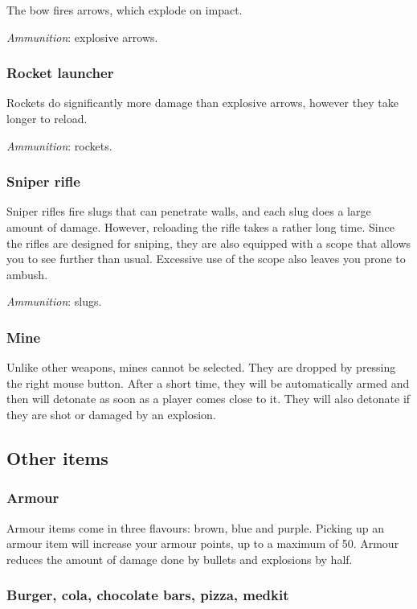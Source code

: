 \documentclass[a4paper,titlepage]{article}
\begin{document}
The bow fires arrows, which explode on impact.

\noindent
\emph{Ammunition}: explosive arrows.

\subsubsection*{Rocket launcher}

Rockets do significantly more damage than explosive arrows, however
they take longer to reload.

\noindent
\emph{Ammunition}: rockets.

\subsubsection*{Sniper rifle}

Sniper rifles fire slugs that can penetrate walls, and each slug does
a large amount of damage.  However, reloading the rifle takes a rather
long time.  Since the rifles are designed for sniping, they are also
equipped with a scope that allows you to see further than usual.
Excessive use of the scope also leaves you prone to ambush.

\noindent
\emph{Ammunition}: slugs.

\subsubsection*{Mine}

Unlike other weapons, mines cannot be selected.  They are dropped by
pressing the right mouse button.  After a short time, they will be
automatically armed and then will detonate as soon as a player comes
close to it.  They will also detonate if they are shot or damaged by
an explosion.


\subsection{Other items}

\subsubsection*{Armour}

Armour items come in three flavours: brown, blue and purple.  Picking
up an armour item will increase your armour points, up to a maximum of
50.  Armour reduces the amount of damage done by bullets and
explosions by half.

\subsubsection*{Burger, cola, chocolate bars, pizza, medkit}
\end{document}
